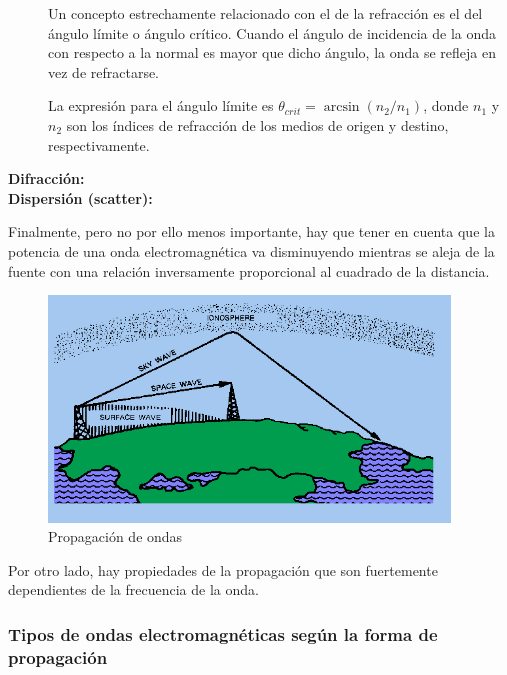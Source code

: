 \begin{description}
Un concepto estrechamente relacionado con el de la refracci\'on es el
del \'angulo l\'imite o \'angulo cr\'itico. Cuando el \'angulo de
incidencia de la onda con respecto a la normal es mayor que dicho
\'angulo, la onda se refleja en vez de refractarse.

La expresi\'on para el \'angulo l\'imite es  $ \theta_{crit} =
\arcsin(n_2/n_1) $, donde $n_1$ y $n_2$ son los \'indices de
refracci\'on de los medios de origen y destino, respectivamente.

\item[\bf Difracci\'on:] 

\item[\bf Dispersi\'on (scatter):] 

\end{description}


Finalmente, pero no por ello menos importante, hay que tener en cuenta
que la potencia de una onda electromagn\'etica va disminuyendo
mientras se aleja de la fuente con una relaci\'on inversamente
proporcional al cuadrado de la distancia.



\begin{figure}[!h]
  \centering
  \includegraphics[width=0.95\textwidth]{06.radionavegacion/Imagenes/06.01.adf/propagacion-ondas.gif}
  \caption{Propagaci\'on de ondas}
  \label{fig:propagacion.de.ondas}
\end{figure}

Por otro lado, hay propiedades de la propagaci\'on que son fuertemente dependientes de la frecuencia de la onda. 



\subsubsection{Tipos de ondas electromagn\'eticas seg\'un la forma de propagaci\'on}
\label{sec:06.tipos.ondas.electromagneticas.segun.propagacion}

